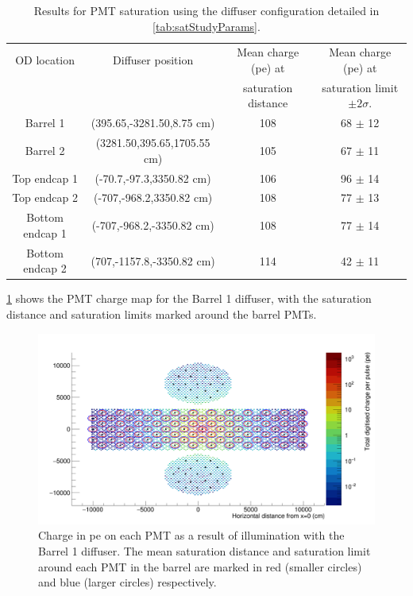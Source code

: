 \documentclass[a4paper,11pt]{article}
\begin{document}
\begin{table}[h!]
    \centering
    \begin{tabular}{|c|c|c|c|}
    \hline
        OD location &Diffuser position & Mean charge (pe) at  & Mean charge (pe) at   \\
                    &                  & saturation distance & saturation limit $\pm2\sigma$.  \\
        \hline
        Barrel 1       & (395.65,-3281.50,8.75 cm)   & 108  & 68 $\pm$ 12 \\ 
        Barrel 2       & (3281.50,395.65,1705.55 cm) & 105  & 67 $\pm$ 11 \\ 
        Top endcap 1   & (-70.7,-97.3,3350.82 cm)    & 106  & 96 $\pm$ 14 \\
        Top endcap 2   & (-707,-968.2,3350.82 cm)    & 108  & 77 $\pm$ 13 \\
        Bottom endcap 1 & (-707,-968.2,-3350.82 cm)  & 108  & 77 $\pm$ 14 \\ 
        Bottom endcap 2 & (707,-1157.8,-3350.82 cm)  & 114  & 42 $\pm$ 11 \\ 
        \hline
    \end{tabular}
    \caption{Results for PMT saturation using the diffuser configuration detailed in \cref{tab:satStudyParams}.}
    \label{tab:satStudyResults_pevalues}
\end{table}

\cref{fig:pmtmap_with_limits} shows the PMT charge map for the Barrel 1 diffuser, with the saturation distance and saturation limits marked around the barrel PMTs.

\begin{figure}
\centering
\includegraphics[width=0.7\linewidth]{diffuse_QCoverage_with_limits.png}
         \caption{Charge in pe on each PMT as a result of illumination with the Barrel 1 diffuser. The mean saturation distance and saturation limit around each PMT in the barrel are marked in red (smaller circles) and blue (larger circles) respectively.}
         \label{fig:pmtmap_with_limits}
\end{figure}
\end{document}
